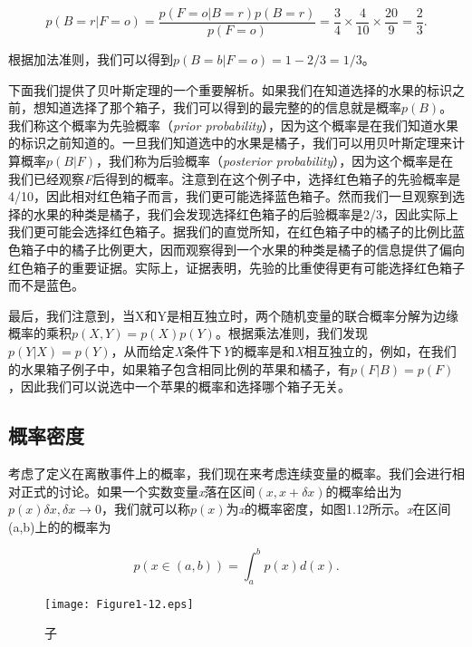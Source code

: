 	\begin{equation}
	p(B = r|F = o) = \frac{p(F = o|B = r)p(B = r)}{p(F = o)} = \frac{3}{4} \times \frac{4}{10} \times \frac{20}{9}= \frac{2}{3}.
	\end{equation}
	
	根据加法准则，我们可以得到$p(B = b|F = o) = 1 -2/3 = 1/3$。
	
	下面我们提供了贝叶斯定理的一个重要解析。如果我们在知道选择的水果的标识之前，想知道选择了那个箱子，我们可以得到的最完整的的信息就是概率$p(B)$。我们称这个概率为先验概率（\textit{prior probability}），因为这个概率是在我们知道水果的标识之前知道的。一旦我们知道选中的水果是橘子，我们可以用贝叶斯定理来计算概率$p(B|F)$，我们称为后验概率（\textit{posterior probability}），因为这个概率是在我们已经观察\textit{F}后得到的概率。注意到在这个例子中，选择红色箱子的先验概率是4/10，因此相对红色箱子而言，我们更可能选择蓝色箱子。然而我们一旦观察到选择的水果的种类是橘子，我们会发现选择红色箱子的后验概率是2/3，因此实际上我们更可能会选择红色箱子。据我们的直觉所知，在红色箱子中的橘子的比例比蓝色箱子中的橘子比例更大，因而观察得到一个水果的种类是橘子的信息提供了偏向红色箱子的重要证据。实际上，证据表明，先验的比重使得更有可能选择红色箱子而不是蓝色。
	
	最后，我们注意到，当X和Y是相互独立时，两个随机变量的联合概率分解为边缘概率的乘积$p(X, Y) = p(X)p(Y)$。根据乘法准则，我们发现$p(Y|X) = p(Y)$，从而给定\textit{X}条件下\textit{Y}的概率是和\textit{X}相互独立的，例如，在我们的水果箱子例子中，如果箱子包含相同比例的苹果和橘子，有$p(F|B) = p(F)$，因此我们可以说选中一个苹果的概率和选择哪个箱子无关。
	
\subsection{概率密度}

	考虑了定义在离散事件上的概率，我们现在来考虑连续变量的概率。我们会进行相对正式的讨论。如果一个实数变量\textit{x}落在区间$(x, x + \delta x)$的概率给出为$p(x)\delta x, \delta x \to 0$，我们就可以称$p(x)$为\textit{x}的概率密度，如图1.12所示。\textit{x}在区间(a,b)上的的概率为
	
	\begin{equation}
	p(x \in (a,b)) = \int_{a}^{b} p(x) d(x).
	\end{equation}
	
	\begin{figure}[t]
		\parbox{.4\textwidth}{\caption{子}}
		\parbox{.5\textwidth}{\texttt{[image: Figure1-12.eps]}}
	\end{figure}
	